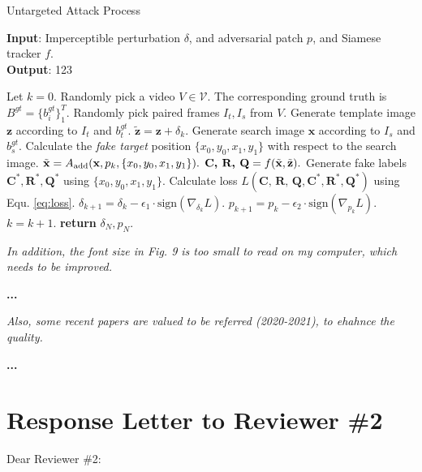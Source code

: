 \documentclass[12pt]{article}
\begin{document}
  \begin{algorithm}[tb]
    \caption{Untargeted Attack Process}
    \label{alg:algorithm_untargeted_attack}
    \textbf{Input}: Imperceptible perturbation $\delta$, and adversarial patch $p$, and Siamese tracker $f$.\\
    \textbf{Output}: 123
    \begin{algorithmic}[1] %
    \STATE Let $k = 0$.
    \STATE Randomly pick a video $V\in \mathcal{V}$. The corresponding ground truth is $B^{gt}=\{b^{gt}_i\}^T_1$.
    \STATE Randomly pick paired frames $I_t, I_s$ from $V$.
    \STATE Generate template image $\textbf{z}$ according to $I_t$ and $b^{gt}_t$.
    \STATE $\tilde{\textbf{z}} = \textbf{z} + \delta_k.$
    \STATE Generate search image $\textbf{x}$ according to $I_s$ and $b^{gt}_s$.
    \STATE Calculate the \textit{fake target} position $\{x_0, y_0, x_1, y_1\}$ with respect to the search image.
    \STATE $\tilde{\textbf x} = A_{\text{add}}(\textbf x, p_k, \{x_0, y_0, x_1, y_1\}).$
    \STATE $\textbf{C, R, Q} = f(\tilde {\textbf x}, \tilde{\textbf z}).$
    \STATE Generate fake labels $\textbf{C}^*,\textbf{R}^*,\textbf{Q}^*$ using $\{x_0, y_0, x_1, y_1\}$.
    \STATE Calculate loss $L(\textbf{C, R, Q}, \textbf{C}^*, \textbf{R}^*, \textbf{Q}^*)$ using Equ. \ref{eq:loss}.
    \STATE $\delta_{k+1} = \delta_{k} - \epsilon_1 \cdot \text{sign}(\nabla_{\delta_k}L).$
    \STATE $p_{k+1} = p_{k} - \epsilon_2 \cdot \text{sign}(\nabla_{p_k}L).$
    \STATE $k = k + 1.$
    \ENDWHILE
    \STATE \textbf{return} $\delta_N, p_N.$
    \end{algorithmic}
    \label{alg}
  \end{algorithm}

\textit{In addition, the font size in Fig. 9 is too small to read on my computer, which needs to be improved.}

\textbf{...}

\textit{Also, some recent papers are valued to be referred (2020-2021), to ehahnce the quality.}

\textbf{...}

\newpage
{\centering\section*{Response Letter to Reviewer \#2}}
\noindent Dear Reviewer \#2:
\end{document}
